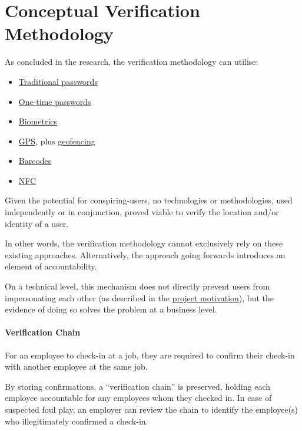 \section{Conceptual Verification Methodology}
\label{s:concept}

As concluded in the research, the verification methodology
can utilise: 

\begin{itemize} 

  \item \hyperref[ss:passwords]{Traditional passwords}

  \item \hyperref[ss:otp]{One-time passwords}

  \item \hyperref[ss:biometrics]{Biometrics}

  \item \hyperref[ss:gps]{GPS}, plus
        \hyperref[ss:geofencing]{geofencing} 

  \item \hyperref[ss:barcodes]{Barcodes} 

  \item \hyperref[ss:nfc]{NFC} 

\end{itemize} 

Given the potential for \gls{conspiring-users}, no
technologies or methodologies, used independently or in
conjunction, proved viable to verify the location and/or
identity of a user.

In other words, the verification methodology cannot
exclusively rely on these existing approaches.
Alternatively, the approach going forwards introduces an
element of accountability.

On a technical level, this mechanism does not directly
prevent users from impersonating each other (as described
in the \hyperref[s:motivation]{project motivation}), but
the evidence of doing so solves the problem at a business
level.

\paragraph{Verification Chain}

For an employee to \gls{check-in} at a job, they are
required to confirm their check-in with another employee at
the same job.

By storing confirmations, a \enquote{verification chain} is
preserved, holding each employee accountable for any
employees whom they checked in.
In case of suspected foul play, an employer can review the
chain to identify the employee(s) who illegitimately
confirmed a check-in.

